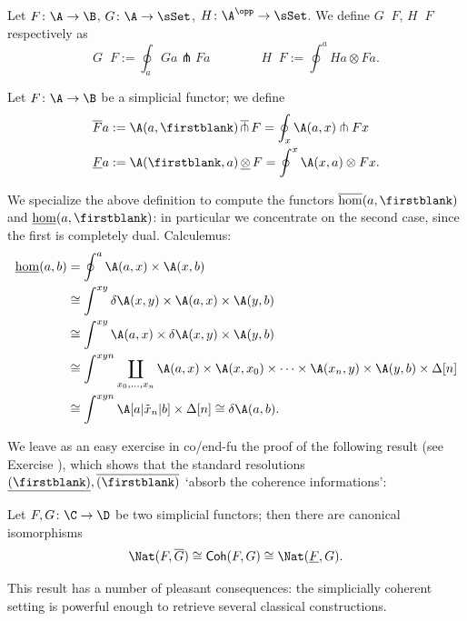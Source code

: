 \def\opitchfork{\mathop{\overline{\pitchfork}}}
\def\uotimes{\mathop{\underline{\otimes}}}
\begin{definition}
Let $F \colon \A \to \B$, $G\colon \A \to \sSet$, $H\colon \A^\opp \to \sSet$.
We define $G \opitchfork F$, $H \uotimes F$ respectively as 
\[
G \opitchfork F := \oint_a Ga\pitchfork Fa \qquad\qquad 
H \uotimes F := \oint^a Ha \otimes Fa.
\]
\end{definition}
\begin{definition}
Let $F\colon \A \to \B$ be a simplicial functor; we define
\begin{align*}
\overline{F}a &:= \A(a,\firstblank)\opitchfork F = \oint_x \A(a,x)\pitchfork Fx\\
\underline{F}a &:= \A(\firstblank,a)\uotimes F =  \oint^x \A(x,a)\otimes Fx.
\end{align*}
\end{definition}
\begin{example}\label{thehoms}
We specialize the above definition to compute the functors
$\overline{\hom}(a,\firstblank)$ and $\underline{\hom}(a,\firstblank)$: in particular we concentrate on the second case, since the first is completely dual. Calculemus:
\begin{align*}
\underline{\hom}(a,b) & = \oint^a \A(a,x) \times \A(x,b)\\
&\cong \int^{xy} \delta \A(x,y) \times \A(a,x)\times \A(y,b)\\
&\cong \int^{xy} \A(a,x)\times \delta\A(x,y) \times \A(y,b)\\
&\cong \int^{xyn} \coprod_{x_0,\dots, x_n} \A(a,x)\times \A(x,x_0)\times \dots\times \A(x_n,y)\times \A(y,b)\times \Delta[n]\\
&\cong \int^{xyn} \A[a|\tilde{x}_n|b]\times\Delta[n] \cong \delta \A(a,b).
\end{align*} 
\end{example}
We leave as an easy exercise in co/end-fu the proof of the following result (see Exercise ), which shows that the standard resolutions $\underline{(\firstblank)}, \overline{(\firstblank)}$ `absorb the coherence informations':
\begin{proposition}\label{absorb}
Let $F,G \colon \C \to \D$ be two simplicial functors; then there are canonical isomorphisms 
\[
\Nat(F, \overline G) \cong \textsf{Coh}(F,G) \cong \Nat(\underline F,G).
\]
\end{proposition}
This result has a number of pleasant consequences: the simplicially coherent setting is powerful enough to retrieve several classical constructions.
